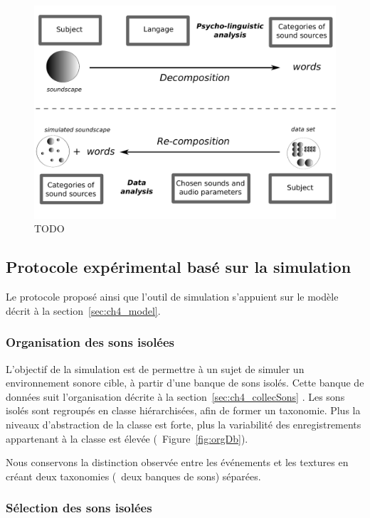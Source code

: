 \begin{figure}[bth]
        \myfloatalign
        \includegraphics[width=.8\linewidth]{gfx/1}
       \caption{TODO}\label{fig:paradigmeSimu1}
\end{figure}

\subsection{Protocole expérimental basé sur la simulation}

Le protocole proposé ainsi que l'outil de simulation s'appuient sur le modèle décrit à la section~\ref{sec:ch4_model}.

\subsubsection{Organisation des sons isolées}

L'objectif de la simulation est de permettre à un sujet de simuler un environnement sonore cible, à partir d'une banque de sons isolés. Cette banque de données suit l'organisation décrite à la section~\ref{sec:ch4_collecSons} . Les sons isolés sont regroupés en classe hiérarchisées, afin de former un taxonomie. Plus la niveaux d'abstraction de la classe est forte, plus la variabilité des enregistrements appartenant à la classe est élevée (\cf~Figure~\ref{fig:orgDb}). 
 
Nous conservons la distinction observée entre les événements et les textures en créant deux taxonomies (\ie~deux banques de sons) séparées.

\subsubsection{Sélection des sons isolées}

